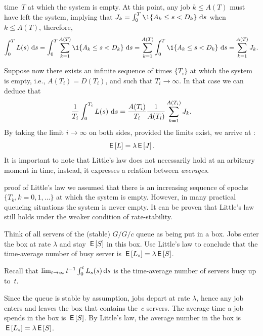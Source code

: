\documentclass[queueing-book.tex]{subfiles}
\begin{document}
 time~$T$ at which the system is empty. At this point, any job $k\leq A(T)$ must have left the system, implying that $ \J_k = \int_0^T \1{A_k \leq s < D_k}\,\d s$ when $k\leq A(T)$, therefore,
\begin{equation*}
 \int_0^T \L(s)\, \d s  = \int_0^T \sum_{k=1}^{A(T)} \1{A_k \leq s < D_k}\, \d s
 = \sum_{k=1}^{A(T)}\int_0^T \1{A_k \leq s < D_k}\, \d s = \sum_{k=1}^{A(T)} \J_k.
\end{equation*}

Suppose now there exists an infinite sequence of  times $\{T_i\}$ at which the system is empty, i.e., $A(T_i) = D(T_i)$, and such that $T_i\to\infty$. In that case we can deduce that
\begin{equation*}
 \frac 1 {T_i} \int_0^{T_i} L(s)\, \,\textrm{d}s = \frac{A(T_i)} {T_i} \frac{1}{A(T_i)} \sum_{k=1}^{A(T_i)} J_k.
\end{equation*}
By taking the limit $i\to\infty$ on both sides, provided the limits exist, we arrive at :
\begin{equation*}
 \,\mathsf{E}\left[L\right] = \lambda \,\mathsf{E}\left[J\right].
\end{equation*}
It is important to note that  Little's law does  not necessarily hold at an arbitrary moment in time, instead, it expresses a relation between \emph{averages}.


 proof of Little's law we assumed that there is an increasing sequence of epochs $\{T_k, k=0,1,\ldots\}$ at which the system is empty.
However, in many practical queueing situations the system is never empty.
It can be proven that Little's law still holds under the weaker condition of rate-stability.




\begin{exercise}\label{ex:37}
Think of all servers of the (stable) $G/G/c$ queue as being put in a box.
Jobs enter the box at rate $\lambda$ and stay $\,\mathsf{E}\left[S\right]$ in this box.
Use Little's law to conclude that the time-average number of busy server is $\,\mathsf{E}\left[L_s\right] = \lambda \,\mathsf{E}\left[S\right]$.
\begin{hint}
Recall that $\lim_{t\to\infty} t^{-1}\int_0^t L_s(s)\,\textrm{d}s$ is the time-average number of servers busy up to~$t$.
\end{hint}
\begin{solution}
Since the queue is stable by assumption, jobs depart at rate $\lambda$, hence any job enters and leaves the box that contains the~$c$ servers.
The average time a job spends in the box is $\,\mathsf{E}\left[S\right]$.
By Little's law, the average number in the box is $\,\mathsf{E}\left[L_s\right] = \lambda \,\mathsf{E}\left[S\right]$.
\end{solution}
\end{exercise}
\end{document}
